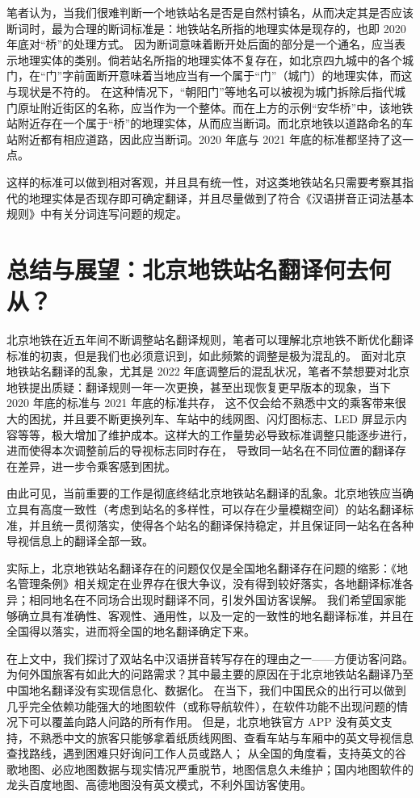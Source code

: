 \documentclass[a4paper,UTF8,12pt]{ctexart}
\begin{document}
        笔者认为，当我们很难判断一个地铁站名是否是自然村镇名，从而决定其是否应该断词时，最为合理的断词标准是：地铁站名所指的地理实体是现存的，也即 2020 年底对“桥”的处理方式。
        因为断词意味着断开处后面的部分是一个通名，应当表示地理实体的类别。倘若站名所指的地理实体不复存在，如北京四九城中的各个城门，在“门”字前面断开意味着当地应当有一个属于“门”（城门）的地理实体，而这与现状是不符的。
        在这种情况下，“朝阳门”等地名可以被视为城门拆除后指代城门原址附近街区的名称，应当作为一个整体。而在上方的示例“安华桥”中，该地铁站附近存在一个属于“桥”的地理实体，从而应当断词。而北京地铁以道路命名的车站附近都有相应道路，因此应当断词。2020 年底与 2021 年底的标准都坚持了这一点。

        这样的标准可以做到相对客观，并且具有统一性，对这类地铁站名只需要考察其指代的地理实体是否现存即可确定翻译，并且尽量做到了符合《汉语拼音正词法基本规则》中有关分词连写问题的规定。

\section{总结与展望：北京地铁站名翻译何去何从？}
    北京地铁在近五年间不断调整站名翻译规则，笔者可以理解北京地铁不断优化翻译标准的初衷，但是我们也必须意识到，如此频繁的调整是极为混乱的。
    面对北京地铁站名翻译的乱象，尤其是 2022 年底调整后的混乱状况，笔者不禁想要对北京地铁提出质疑：翻译规则一年一次更换，甚至出现恢复更早版本的现象，当下 2020 年底的标准与 2021 年底的标准共存，
    这不仅会给不熟悉中文的乘客带来很大的困扰，并且要不断更换列车、车站中的线网图、闪灯图标志、LED 屏显示内容等等，极大增加了维护成本。这样大的工作量势必导致标准调整只能逐步进行，进而使得本次调整前后的导视标志同时存在，
    导致同一站名在不同位置的翻译存在差异，进一步令乘客感到困扰。
    
    由此可见，当前重要的工作是彻底终结北京地铁站名翻译的乱象。北京地铁应当确立具有高度一致性（考虑到站名的多样性，可以存在少量模糊空间）的站名翻译标准，并且统一贯彻落实，使得各个站名的翻译保持稳定，并且保证同一站名在各种导视信息上的翻译全部一致。
    
    实际上，北京地铁站名翻译存在的问题仅仅是全国地名翻译存在问题的缩影：《地名管理条例》相关规定在业界存在很大争议，没有得到较好落实，各地翻译标准各异；相同地名在不同场合出现时翻译不同，引发外国访客误解。
    我们希望国家能够确立具有准确性、客观性、通用性，以及一定的一致性的地名翻译标准，并且在全国得以落实，进而将全国的地名翻译确定下来。

    在上文中，我们探讨了双站名中汉语拼音转写存在的理由之一——方便访客问路。为何外国旅客有如此大的问路需求？其中最主要的原因在于北京地铁站名翻译乃至中国地名翻译没有实现信息化、数据化。
    在当下，我们中国民众的出行可以做到几乎完全依赖功能强大的地图软件（或称导航软件），在软件功能不出现问题的情况下可以覆盖向路人问路的所有作用。
    但是，北京地铁官方 APP 没有英文支持，不熟悉中文的旅客只能够拿着纸质线网图、查看车站与车厢中的英文导视信息查找路线，遇到困难只好询问工作人员或路人；
    从全国的角度看，支持英文的谷歌地图、必应地图数据与现实情况严重脱节，地图信息久未维护；国内地图软件的龙头百度地图、高德地图没有英文模式，不利外国访客使用。
\end{document}
